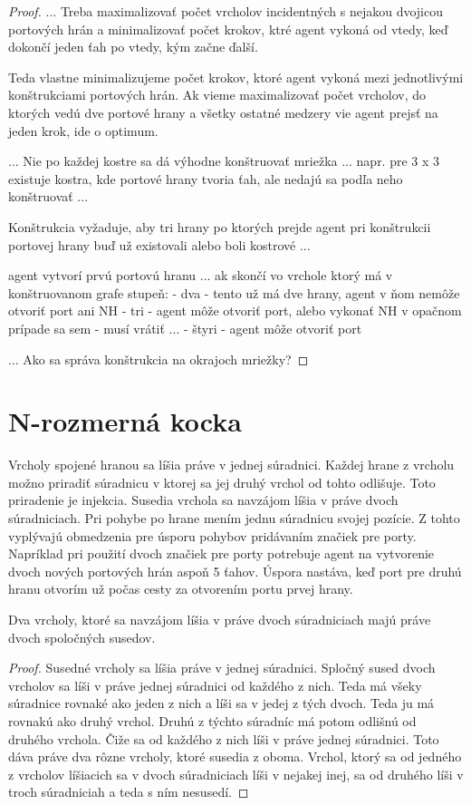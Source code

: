 \begin{proof}
...
Treba maximalizovať počet vrcholov incidentných s nejakou dvojicou portových
 hrán a minimalizovať počet krokov, ktré agent vykoná od vtedy, keď dokončí
jeden ťah po vtedy, kým začne ďalší.

Teda vlastne minimalizujeme počet krokov, ktoré agent vykoná mezi
jednotlivými konštrukciami portových hrán. Ak vieme maximalizovať počet
vrcholov, do ktorých vedú dve portové hrany a všetky ostatné medzery vie
agent prejsť na jeden krok, ide o optimum.

...
Nie po každej kostre sa dá výhodne konštruovať mriežka ...
napr. pre 3 x 3 existuje kostra, kde portové hrany tvoria ťah, ale nedajú sa
podľa neho konštruovať ...

Konštrukcia vyžaduje, aby tri hrany po ktorých prejde agent pri konštrukcii
portovej hrany buď už existovali alebo boli kostrové ...

agent vytvorí prvú portovú hranu ... ak skončí vo vrchole ktorý má v
konštruovanom grafe stupeň:
- dva - tento už má dve hrany, agent v ňom nemôže otvoriť port ani NH
- tri - agent môže otvoriť port, alebo vykonať NH v opačnom prípade sa sem
- musí vrátiť ...
- štyri - agent môže otvoriť port

...
Ako sa správa konštrukcia na okrajoch mriežky?
\fi
\end{proof}




\section{N-rozmerná kocka}
Vrcholy spojené hranou sa líšia práve v jednej súradnici. Každej hrane z
vrcholu možno priradiť súradnicu v ktorej sa jej druhý vrchol od tohto
odlišuje. Toto priradenie je injekcia.
Susedia vrchola sa navzájom líšia v práve dvoch súradniciach. Pri pohybe po
hrane mením jednu súradnicu svojej pozície. Z tohto vyplývajú obmedzenia
pre úsporu pohybov pridávaním značiek pre porty. Napríklad pri použití dvoch
značiek pre porty potrebuje agent na vytvorenie dvoch nových portových hrán
aspoň 5 ťahov. Úspora nastáva, keď port pre druhú hranu otvorím už počas
cesty za otvorením portu prvej hrany.

\begin{lem}
Dva vrcholy, ktoré sa navzájom líšia v práve dvoch súradniciach majú práve dvoch
spoločných susedov.
\end{lem}
\begin{proof}
Susedné vrcholy sa líšia práve v jednej súradnici. Spločný sused dvoch
vrcholov sa líši v práve jednej súradnici od každého z nich. Teda má všeky
súradnice rovnaké ako jeden z nich a líši sa v jedej z tých dvoch. Teda ju
má rovnakú ako druhý vrchol. Druhú z týchto súradníc má potom odlišnú od
druhého vrchola. Čiže sa od každého z nich líši v práve jednej súradnici.
Toto dáva práve dva rôzne vrcholy, ktoré susedia z oboma. Vrchol, ktorý
sa od jedného z vrcholov líšiacich sa v dvoch súradniciach líši v nejakej
inej, sa od druhého líši v troch súradniciah a teda s ním nesusedí.
\end{proof}


